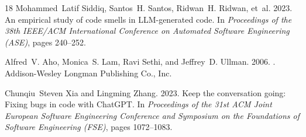 \documentclass[sigconf,screen,nonacm,pbalance]{acmart}
\begin{document}
\begin{thebibliography}{18}
Mohammed~Latif Siddiq, Santos~H. Santos, Ridwan~H. Ridwan, et~al. 2023.
\newblock An empirical study of code smells in LLM-generated code.
\newblock In {\em Proceedings of the 38th IEEE/ACM International Conference on Automated Software Engineering (ASE)}, pages 240--252.

Alfred~V. Aho, Monica~S. Lam, Ravi Sethi, and Jeffrey~D. Ullman. 2006.
.
\newblock Addison-Wesley Longman Publishing Co., Inc.

Chunqiu~Steven Xia and Lingming Zhang. 2023.
\newblock Keep the conversation going: Fixing bugs in code with ChatGPT.
\newblock In {\em Proceedings of the 31st ACM Joint European Software Engineering Conference and Symposium on the Foundations of Software Engineering (FSE)}, pages 1072--1083.

\end{thebibliography}
\end{document}
